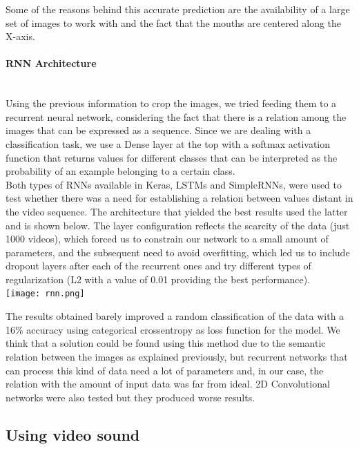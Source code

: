 \documentclass{article}[10pt]
\begin{document}
\begin{multicols}{2}
Some of the reasons behind this accurate prediction are the availability of a
large set of images to work with and the fact that the mouths are centered along
the X-axis.

\paragraph{RNN Architecture} ~\\

Using the previous information to crop the images, we tried feeding them to a
recurrent neural network, considering the fact that there is a relation among the
images that can be expressed as a sequence.  Since we are dealing with a
classification task, we use a Dense layer at the top with a softmax activation
function that returns values for different classes that can be interpreted
as the probability of an example belonging to a certain class.\\

Both types of RNNs available in Keras, LSTMs and SimpleRNNs, were used to test
whether there was a need for establishing a relation between values distant in
the video sequence. The architecture that yielded the best results used the
latter and is shown below. The layer configuration reflects the scarcity of
the data (just 1000 videos), which forced us to constrain our network to a small
amount of parameters, and the subsequent need to avoid overfitting, which led us
to include dropout layers after each of the recurrent ones and try different
types of regularization (L2 with a value of 0.01 providing the best
performance).\\

\noindent\texttt{[image: rnn.png]}


The results obtained barely improved a random classification of the data with a
16\% accuracy using categorical crossentropy as loss function for the model. We
think that a solution could be found using this method due to the semantic
relation between the images as explained previously, but recurrent networks that
can process this kind of data need a lot of parameters and, in our case, the
relation with the amount of input data was far from ideal. 2D Convolutional
networks were also tested but they produced worse results.

\subsection{Using video sound}


\end{multicols}
\end{document}
